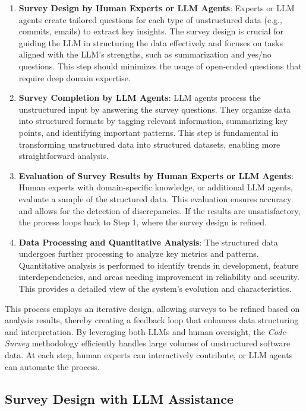 \begin{enumerate}
    \item \textbf{Survey Design by Human Experts or LLM Agents}: Experts or LLM agents create tailored questions for each type of unstructured data (e.g., commits, emails) to extract key insights. The survey design is crucial for guiding the LLM in structuring the data effectively and focuses on tasks aligned with the LLM's strengths, such as summarization and yes/no questions. This step should minimizes the usage of open-ended questions that require deep domain expertise.

    \item \textbf{Survey Completion by LLM Agents}: LLM agents process the unstructured input by answering the survey questions. They organize data into structured formats by tagging relevant information, summarizing key points, and identifying important patterns. This step is fundamental in transforming unstructured data into structured datasets, enabling more straightforward analysis.

    \item \textbf{Evaluation of Survey Results by Human Experts or LLM Agents}: Human experts with domain-specific knowledge, or additional LLM agents, evaluate a sample of the structured data. This evaluation ensures accuracy and allows for the detection of discrepancies. If the results are unsatisfactory, the process loops back to Step 1, where the survey design is refined.

    \item \textbf{Data Processing and Quantitative Analysis}: The structured data undergoes further processing to analyze key metrics and patterns. Quantitative analysis is performed to identify trends in development, feature interdependencies, and areas needing improvement in reliability and security. This provides a detailed view of the system's evolution and characteristics.

\end{enumerate}

This process employs an iterative design, allowing surveys to be refined based on analysis results, thereby creating a feedback loop that enhances data structuring and interpretation. By leveraging both LLMs and human oversight, the \emph{Code-Survey} methodology efficiently handles large volumes of unstructured software data. At each step, human experts can interactively contribute, or LLM agents can automate the process.

\subsection{Survey Design with LLM Assistance}

